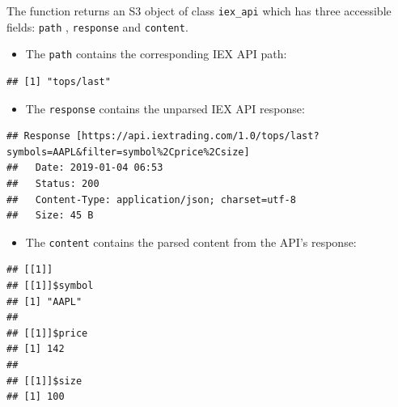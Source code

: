 \documentclass[]{book}
\newenvironment{Shaded}{\begin{snugshade}}{\end{snugshade}}
\newcommand{\OperatorTok}[1]{\textcolor[rgb]{0.81,0.36,0.00}{\textbf{#1}}}
\newcommand{\NormalTok}[1]{#1}
\providecommand{\tightlist}{%
  \setlength{\itemsep}{0pt}\setlength{\parskip}{0pt}}
\theoremstyle{definition}
\theoremstyle{definition}
\theoremstyle{definition}
\theoremstyle{remark}
\begin{document}
The function returns an S3 object of class \texttt{iex\_api} which has
three accessible fields: \texttt{path} , \texttt{response} and
\texttt{content}.

\begin{itemize}
\tightlist
\item
  The \texttt{path} contains the corresponding IEX API path:
\end{itemize}

\begin{Shaded}
\end{Shaded}

\begin{verbatim}
## [1] "tops/last"
\end{verbatim}

\begin{itemize}
\tightlist
\item
  The \texttt{response} contains the unparsed IEX API response:
\end{itemize}

\begin{Shaded}
\end{Shaded}

\begin{verbatim}
## Response [https://api.iextrading.com/1.0/tops/last?symbols=AAPL&filter=symbol%2Cprice%2Csize]
##   Date: 2019-01-04 06:53
##   Status: 200
##   Content-Type: application/json; charset=utf-8
##   Size: 45 B
\end{verbatim}

\begin{itemize}
\tightlist
\item
  The \texttt{content} contains the parsed content from the API's
  response:
\end{itemize}

\begin{Shaded}
\end{Shaded}

\begin{verbatim}
## [[1]]
## [[1]]$symbol
## [1] "AAPL"
## 
## [[1]]$price
## [1] 142
## 
## [[1]]$size
## [1] 100
\end{verbatim}
\end{document}
